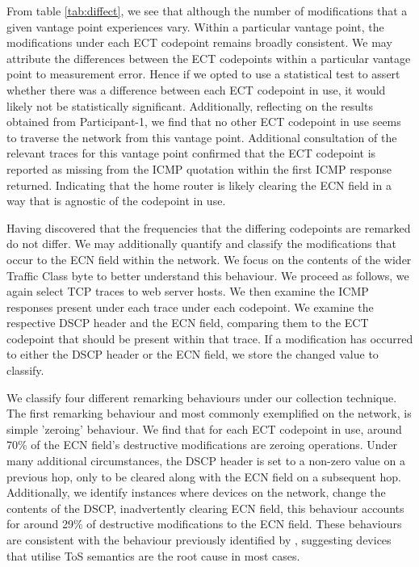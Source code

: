 \documentclass{l4proj}
\begin{document}
From table \ref{tab:diffect}, we see that although the number of modifications that a given vantage point experiences vary. Within a particular vantage point, the modifications under each ECT codepoint remains broadly consistent. We may attribute the differences between the ECT codepoints within a particular vantage point to measurement error. Hence if we opted to use a statistical test to assert whether there was a difference between each ECT codepoint in use, it would likely not be statistically significant. Additionally, reflecting on the results obtained from Participant-1, we find that no other ECT codepoint in use seems to traverse the network from this vantage point. Additional consultation of the relevant traces for this vantage point confirmed that the ECT codepoint is reported as missing from the ICMP quotation within the first ICMP response returned. Indicating that the home router is likely clearing the ECN field in a way that is agnostic of the codepoint in use.


Having discovered that the frequencies that the differing codepoints are remarked do not differ. We may additionally quantify and classify the modifications that occur to the ECN field within the network. We focus on the contents of the wider Traffic Class byte to better understand this behaviour. We proceed as follows, we again select TCP traces to web server hosts. We then examine the ICMP responses present under each trace under each codepoint. We examine the respective DSCP header and the ECN field, comparing them to the ECT codepoint that should be present within that trace. If a modification has occurred to either the DSCP header or the ECN field, we store the changed value to classify.

We classify four different remarking behaviours under our collection technique. The first remarking behaviour and most commonly exemplified on the network, is simple 'zeroing' behaviour. We find that for each ECT codepoint in use, around 70\% of the ECN field's destructive modifications are zeroing operations. Under many additional circumstances, the DSCP header is set to a non-zero value on a previous hop, only to be cleared along with the ECN field on a subsequent hop. Additionally, we identify instances where devices on the network, change the contents of the DSCP, inadvertently clearing ECN field, this behaviour accounts for around 29\% of destructive modifications to the ECN field. These behaviours are consistent with the behaviour previously identified by \cite{custura_exploring_2018}, suggesting devices that utilise ToS semantics are the root cause in most cases.
\end{document}
